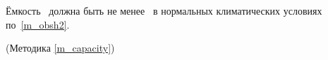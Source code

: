Ёмкость \dut \ должна быть не менее \capacity \ в нормальных климатических условиях по~\ref{m_obsh2}.

\begin{flushright}
	(Методика \ref{m_capacity})
\end{flushright}

